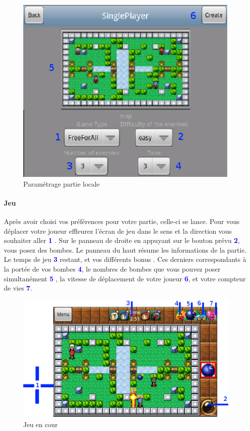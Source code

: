 	\begin{figure}[H]
	\centering
		\includegraphics[scale=0.7]{Manuel/Img/15}
		\caption{Paramétrage partie locale}
	\end{figure}
	
	\paragraph{Jeu\\}
	Après avoir choisi vos préférences pour votre partie, celle-ci se lance.
	Pour vous déplacer votre joueur effleurez l'écran de jeu dans le sens et la
	direction vous souhaiter aller \textcolor{blue}{\textbf{1}} .	
	Sur le panneau de droite en appuyant sur le
	bouton prévu \textcolor{blue}{\textbf{2}}, vous posez des bombes.
	Le panneau du haut résume les informations de la partie. Le temps de jeu
	\textcolor{blue}{\textbf{3}} restant, et vos différents bonus . Ces derniers
	correspondants à la portée de vos bombes \textcolor{blue}{\textbf{4}}, le
	nombres de bombes que vous pouvez poser
	simultanément \textcolor{blue}{\textbf{5}} , la vitesse de déplacement de votre
	joueur \textcolor{blue}{\textbf{6}}, et votre compteur de vies
	\textcolor{blue}{\textbf{7}}.
	
	\begin{figure}[H]
	\centering
		\includegraphics[scale=0.6]{Manuel/Img/21}
		\caption{Jeu en cour}
	\end{figure}
	
